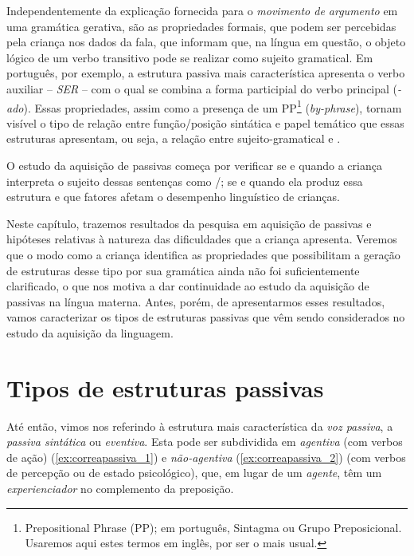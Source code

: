 \documentclass[output=paper]{LSP/langsci}
\begin{document}
Independentemente da explicação fornecida para o \textit{movimento de argumento} em uma gramática gerativa, são as propriedades formais, que podem ser percebidas pela criança nos dados da fala, que informam que, na língua em questão, o objeto lógico de um verbo transitivo pode se realizar como sujeito gramatical. Em português, por exemplo, a estrutura passiva mais característica apresenta o verbo auxiliar – \textit{SER} – com o qual se combina a forma participial do verbo principal (\textit{-ado}). Essas propriedades, assim como a presença de um PP\footnote{Prepositional Phrase (PP); em português, Sintagma ou Grupo Preposicional. Usaremos aqui estes termos em inglês, por ser o mais usual.} (\textit{by-phrase}), tornam visível o tipo de relação entre função/posição sintática e papel temático que essas estruturas apresentam, ou seja, a relação entre sujeito-gramatical e .

O estudo da aquisição de passivas começa por verificar se e quando a criança interpreta o sujeito dessas sentenças como /; se e quando ela produz essa estrutura e que fatores afetam o desempenho linguístico de crianças. 

Neste capítulo, trazemos resultados da pesquisa em aquisição de passivas e hipóteses relativas à natureza das dificuldades que a criança apresenta. Veremos que o modo como a criança identifica as propriedades que possibilitam a geração de estruturas desse tipo por sua gramática ainda não foi suficientemente clarificado, o que nos motiva a dar continuidade ao estudo da aquisição de passivas na língua materna. Antes, porém, de apresentarmos esses resultados, vamos caracterizar os tipos de estruturas passivas que vêm sendo considerados no estudo da aquisição da linguagem.  

\section{Tipos de estruturas passivas}
\label{sec:correapassiva_tipos_passivas}
Até então, vimos nos referindo à estrutura mais característica da \textit{voz passiva}, a \textit{passiva sintática} ou \textit{eventiva}. Esta pode ser subdividida em \textit{agentiva} (com verbos de ação) (\ref{ex:correapassiva_1}) e \textit{não-agentiva} (\ref{ex:correapassiva_2}) (com verbos de percepção ou de estado psicológico), que, em lugar de um \textit{agente}, têm um \textit{experienciador} no complemento da preposição. 
\end{document}
